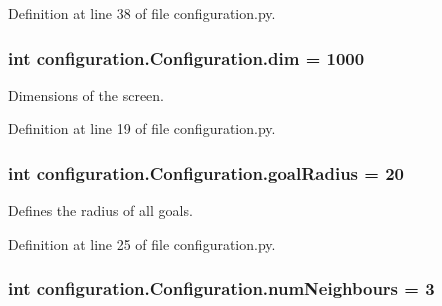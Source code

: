 Definition at line 38 of file configuration.\-py.

\hypertarget{classconfiguration_1_1Configuration_af63a65a65716f36cb11afd4d0e7f318f}{
\subsubsection[{dim}]{\setlength{\rightskip}{0pt plus 5cm}int configuration.\-Configuration.\-dim = 1000\hspace{0.3cm}{\ttfamily [static]}}}\label{classconfiguration_1_1Configuration_af63a65a65716f36cb11afd4d0e7f318f}


Dimensions of the screen. 



Definition at line 19 of file configuration.\-py.

\hypertarget{classconfiguration_1_1Configuration_a1a5fee18f20950a467d1b94d4d276c78}{
\subsubsection[{goal\-Radius}]{\setlength{\rightskip}{0pt plus 5cm}int configuration.\-Configuration.\-goal\-Radius = 20\hspace{0.3cm}{\ttfamily [static]}}}\label{classconfiguration_1_1Configuration_a1a5fee18f20950a467d1b94d4d276c78}


Defines the radius of all goals. 



Definition at line 25 of file configuration.\-py.

\hypertarget{classconfiguration_1_1Configuration_a7eef6f8f2eb6d4a8fa4a45ddf9f6e1ba}{
\subsubsection[{num\-Neighbours}]{\setlength{\rightskip}{0pt plus 5cm}int configuration.\-Configuration.\-num\-Neighbours = 3\hspace{0.3cm}{\ttfamily [static]}}}\label{classconfiguration_1_1Configuration_a7eef6f8f2eb6d4a8fa4a45ddf9f6e1ba}


